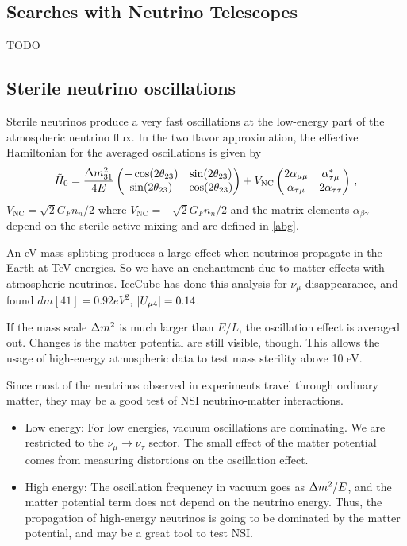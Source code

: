 \documentclass[twocolumn]{article}
\renewcommand{\a}{\ensuremath{\alpha}}
\renewcommand{\b}{\ensuremath{\beta}}
\newcommand{\nm}{\ensuremath{\nu_\mu}}
\newcommand{\nmt}{\ensuremath{\nu_\mu \to \nu_\tau}}
\renewcommand{\th}[1][]{%
  \theta\ifx\\#1\\\else_\text{#1}\fi
}
\renewcommand{\t}[1]{\ensuremath{\text{{#1}}}}
\newcommand*{\dm}[1][]{%
  \Delta m^2\ifx\\#1\\\else_\text{#1}\fi
}
\begin{document}
\subsection*{Searches with Neutrino Telescopes}
TODO
\subsection*{Sterile neutrino oscillations}
Sterile neutrinos produce a very fast oscillations at the low-energy part of the atmospheric neutrino flux. In the two flavor approximation, the effective Hamiltonian for the averaged oscillations is given by
\begin{align*}
  \tilde{H}_0 = \frac{\dm[31]}{4E} 
  \begin{pmatrix} -\cos(2\th_{23}) & \sin(2\th_{23}) \\ \sin(2\th_{23}) & \cos(2\th_{23}) \end{pmatrix}
  + V_\t{NC} \begin{pmatrix} 2 \a_{\mu\mu} & \a^*_{\tau\mu} \\ \a_{\tau\mu} & 2\a_{\tau\tau} \end{pmatrix} 
\,,\end{align*}
$V_\t{NC} = \sqrt{2}G_F n_n/2 $ where $V_\t{NC} = -\sqrt{2}G_F n_n/2 $ and the matrix elements $\a_{\b \gamma}$ depend on the sterile-active mixing and are defined in \eqref{abg}.

An eV mass splitting produces a large effect when neutrinos propagate in the Earth at TeV energies. So we have an enchantment due to matter effects with atmospheric neutrinos. IceCube has done this analysis for $\nm$ disappearance, and found $dm[41] = 0.92 eV^2$, $\abs{U_{\mu 4}} = 0.14$. 

If the mass scale $\dm$ is much larger than $E/L$, the oscillation effect is averaged out. Changes is the matter potential are still visible, though. This allows the usage of high-energy atmospheric data to test mass sterility above 10 eV.

Since most of the neutrinos observed in experiments travel through ordinary matter, they may be a good test of NSI neutrino-matter interactions.
\begin{itemize}
  \item Low energy: For low energies, vacuum oscillations are dominating. We are restricted to the $\nmt$ sector. The small effect of the matter potential comes from measuring distortions on the oscillation effect.
  \item High energy: The oscillation frequency in vacuum goes as $\dm/E$, and the matter potential term does not depend on the neutrino energy. Thus, the propagation of high-energy neutrinos is going to be dominated by the matter potential, and may be a great tool to test NSI.
\end{itemize}
\end{document}
